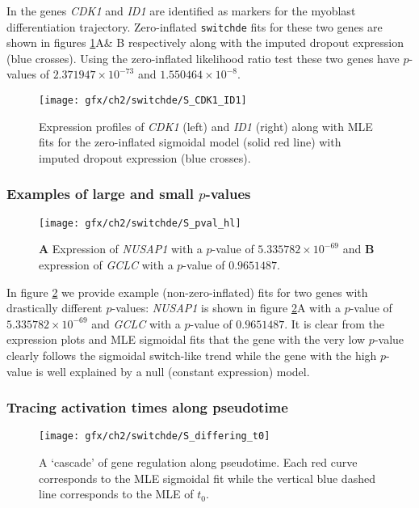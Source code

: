 In \cite{Trapnell2014-xi} the genes \emph{CDK1} and \emph{ID1} are identified as markers for the myoblast differentiation trajectory. Zero-inflated \texttt{switchde} fits for these two genes are shown in figures \ref{fig:S1}A\& B respectively along with the imputed dropout expression (blue crosses). Using the zero-inflated likelihood ratio test these two genes have $p$-values of $2.371947 \times 10^{-73}$ and $1.550464 \times 10^{-8}$.

\begin{figure}[h]
\centering
\texttt{[image: gfx/ch2/switchde/S\_CDK1\_ID1]}
\caption[Expression profiles of MLE fits.]{Expression profiles of \emph{CDK1} (left) and \emph{ID1} (right) along with MLE fits for the zero-inflated sigmoidal model (solid red line) with imputed dropout expression (blue crosses).}\label{fig:S1}
\end{figure}

\subsubsection{Examples of large and small $p$-values}

\begin{figure}[h]%
\centering
\texttt{[image: gfx/ch2/switchde/S\_pval\_hl]}
\caption[Sigmoidal expression of example genes.]{\textbf{A} Expression of \emph{NUSAP1} with a $p$-value of $5.335782 \times 10^{-69}$ and \textbf{B} expression of \emph{GCLC} with a $p$-value of $0.9651487$.}\label{fig:S2}
\end{figure}

In figure \ref{fig:S2} we provide example (non-zero-inflated) fits for two genes with drastically different $p$-values: \emph{NUSAP1} is shown in figure \ref{fig:S2}A with a $p$-value of $5.335782 \times 10^{-69}$ and \emph{GCLC} with a $p$-value of $0.9651487$. It is clear from the expression plots and MLE sigmoidal fits that the gene with the very low $p$-value clearly follows the sigmoidal switch-like trend while the gene with the high $p$-value is well explained by a null (constant expression) model.

\subsubsection{Tracing activation times along pseudotime}


\begin{figure}[h]%
\centering
\texttt{[image: gfx/ch2/switchde/S\_differing\_t0]}
\caption[A `cascade' of gene regulation along pseudotime.]{A `cascade' of gene regulation along pseudotime. Each red curve corresponds to the MLE sigmoidal fit while the vertical blue dashed line corresponds to the MLE of $t_0$.}\label{fig:S3}
\end{figure}

